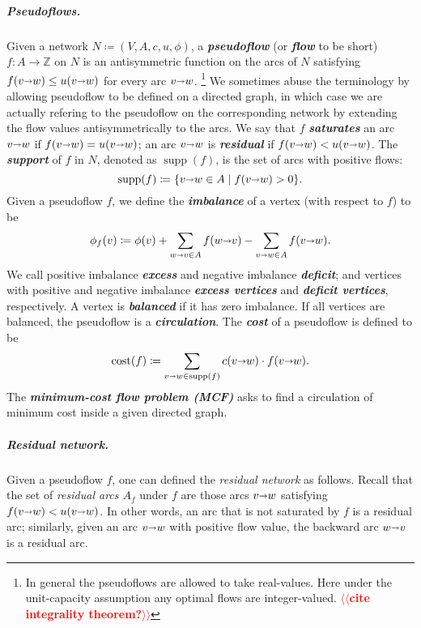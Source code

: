 \documentclass[a4paper,UKenglish]{socg-lipics-v2018}
\makeatletter
\def\note#1{\textcolor{red}{{#1}}}
\def\ints{\mathbb{Z}}
\def\fsupply{\phi}
\def\arcto{\mathord\shortrightarrow}
\def\arc#1#2{#1\arcto#2}
\def\cost{\operatorname{cost}}
\def\supp{\operatorname{supp}}
\theoremstyle{plain}
\numberwithin{figure}{section}
\renewcommand{\paragraph}{\subparagraph}
\def\EMPH#1{\textbf{\emph{\boldmath #1}}}
\def\n@te#1{\textsf{\boldmath \textbf{$\langle\!\langle$#1$\rangle\!\rangle$}}\leavevmode}
\def\note#1{\textcolor{red}{\n@te{#1}}}
\makeatother
\begin{document}
\paragraph{Pseudoflows.}
Given a network $N \coloneqq (V,A,c,u,\fsupply)$,
a \EMPH{pseudoflow} (or \EMPH{flow} to be short) $f\colon A \to \ints$ on $N$ is an antisymmetric function on the arcs of $N$
satisfying $f(\arc vw) \leq u(\arc vw)$ for every arc $\arc vw$.%
\footnote{In general the pseudoflows are allowed to take real-values.  Here under the unit-capacity assumption any optimal flows are integer-valued. \note{cite integrality theorem?}}
%
We sometimes abuse the terminology by allowing pseudoflow to be defined on a directed graph, in which case we are actually refering to the pseudoflow on the corresponding network by extending the flow values antisymmetrically to the arcs.
%
We say that $f$ \EMPH{saturates} an arc $\arc vw$ if $f(\arc vw) = u(\arc vw)$; an arc $\arc vw$ is \EMPH{residual} if $f(\arc vw) < u(\arc vw)$.
The \EMPH{support} of $f$ in $N$, denoted as \EMPH{$\supp(f)$}, is the set of arcs with positive flows:
\[
\supp(f) \coloneqq \{\arc vw \in A \mid f(\arc vw) > 0\}.
\]
%
Given a pseudoflow $f$, we define the \EMPH{imbalance} of a vertex (with respect to $f$) to be
\[
\EMPH{$\fsupply_f(v)$} \coloneqq \fsupply(v) + \sum_{\arc wv \in A}{f(\arc wv)} - \sum_{\arc vw \in A}{f(\arc vw)}.
\]
We call positive imbalance \EMPH{excess} and negative imbalance \EMPH{deficit};
and vertices with positive and negative imbalance \EMPH{excess vertices} and
\EMPH{deficit vertices}, respectively.
A vertex is \EMPH{balanced} if it has zero imbalance.
If all vertices are balanced, the pseudoflow is a \EMPH{circulation}.
The \EMPH{cost} of a pseudoflow
is defined to be
\[
 \EMPH{$\cost(f)$} \coloneqq \sum_{\arc vw \in \supp(f)} c(\arc vw) \cdot f(\arc vw).
\]
%
The \EMPH{minimum-cost flow problem (MCF)} asks to find a circulation of minimum cost inside a given directed graph.

\paragraph{Residual network.}
Given a pseudoflow $f$, one can defined the \emph{residual network} as follows.
%
Recall that the set of \emph{residual arcs $A_f$} under $f$ are those arcs $\arc vw$ satisfying $f(\arc vw) < u(\arc vw)$.  In other words, an arc that is not saturated by $f$ is a residual arc; similarly, given an arc $\arc vw$ with positive flow value, the backward arc $\arc wv$ is a residual arc.
\end{document}
